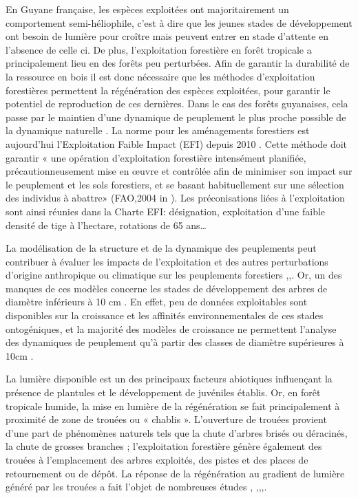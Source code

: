 \documentclass[
  12pt,
  american,
  a4paper,
  extrafontsizes,onecolumn,openright
  ]{memoir}
\begin{document}
En Guyane française, les espèces exploitées ont majoritairement un comportement semi-héliophile, c'est à dire que les jeunes stades de développement ont besoin de lumière pour croître mais peuvent entrer en stade d'attente en l'absence de celle ci. De plus, l'exploitation forestière en forêt tropicale a principalement lieu en des forêts peu perturbées. Afin de garantir la durabilité de la ressource en bois il est donc nécessaire que les méthodes d'exploitation forestières permettent la régénération des espèces exploitées, pour garantir le potentiel de reproduction de ces dernières. Dans le cas des forêts guyanaises, cela passe par le maintien d'une dynamique de peuplement le plus proche possible de la dynamique naturelle \autocite{Guitet2014}. La norme pour les aménagements forestiers est aujourd'hui l'Exploitation Faible Impact (EFI) depuis 2010 \autocite{ONF2017}. Cette méthode doit garantir « une opération d'exploitation forestière intensément planifiée, précautionneusement mise en œuvre et contrôlée afin de minimiser son impact sur le peuplement et les sols forestiers, et se basant habituellement sur une sélection des individus à abattre» (FAO,2004 in \autocite{ONF2017}). Les préconisations liées à l'exploitation sont ainsi réunies dans la Charte EFI: désignation, exploitation d'une faible densité de tige à l'hectare, rotations de 65 ans\ldots{}

La modélisation de la structure et de la dynamique des peuplements peut contribuer à évaluer les impacts de l'exploitation et des autres perturbations d'origine anthropique ou climatique sur les peuplements forestiers \autocite{Fargeon2016},\autocite{Fischer2016},\autocite{Gourlet-Fleury2005a}. Or, un des manques de ces modèles concerne les stades de développement des arbres de diamètre inférieurs à 10 cm \autocite{Gourlet-Fleury2005a}. En effet, peu de données exploitables sont disponibles sur la croissance et les affinités environnementales de ces stades ontogéniques, et la majorité des modèles de croissance ne permettent l'analyse des dynamiques de peuplement qu'à partir des classes de diamètre supérieures à 10cm \autocite{Herault2010d}.

La lumière disponible est un des principaux facteurs abiotiques influençant la présence de plantules et le développement de juvéniles établis. Or, en forêt tropicale humide, la mise en lumière de la régénération se fait principalement à proximité de zone de trouées ou « chablis ». L'ouverture de trouées provient d'une part de phénomènes naturels tels que la chute d'arbres brisés ou déracinés, la chute de grosses branches ; l'exploitation forestière génère également des trouées à l'emplacement des arbres exploités, des pistes et des places de retournement ou de dépôt. La réponse de la régénération au gradient de lumière généré par les trouées a fait l'objet de nombreuses études \autocite{Poorter1999}, \autocite{Sheil2006} ,\autocite{Ruger2011a},\autocite{Laurans2012},\autocite{Zhu2014}.
\end{document}
